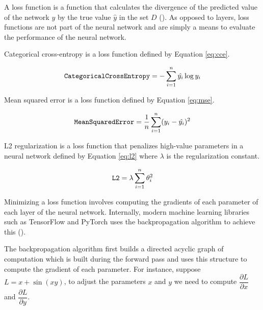 A loss function is a function that calculates the divergence of the predicted value of the network $y$ by the true value $\hat{y}$ in the set $D$ (\cite{loss}). As opposed to layers, loss functions are not part of the neural network and are simply a means to evaluate the performance of the neural network.

Categorical cross-entropy is a loss function defined by Equation \ref{eq:cce}.

\begin{equation}
    \verb|CategoricalCrossEntropy| = -\sum_{i=1}^{n} \hat{y_i} \log y_i
    \label{eq:cce}
\end{equation}

Mean squared error is a loss function defined by Equation \ref{eq:mse}.

\begin{equation}
    \verb|MeanSquaredError| = \frac{1}{n}\sum_{i=1}^{n} (y_i - \hat{y_i})^{2}
    \label{eq:mse}
\end{equation}

L2 regularization is a loss function that penalizes high-value parameters in a neural network defined by Equation \ref{eq:l2} where $\lambda$ is the regularization constant.

\begin{equation}
    \verb|L2| = \lambda \sum_{i=1}^n\theta_i^2
    \label{eq:l2}
\end{equation}

Minimizing a loss function involves computing the gradients of each parameter of each layer of the neural network. Internally, modern machine learning libraries such as TensorFlow and PyTorch uses the backpropagation algorithm to achieve this (\cite{pytorch}).

The backpropagation algorithm first builds a directed acyclic graph of computation which is built during the forward pass and uses this structure to compute the gradient of each parameter. For instance, suppose $L = x + \sin(xy)$, to adjust the parameters $x$ and $y$ we need to compute $\dfrac{\partial L}{\partial x}$ and $\dfrac{\partial L}{\partial y}$.

